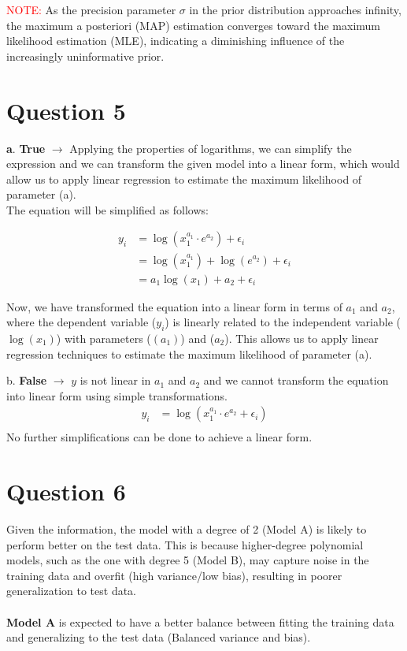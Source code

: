 \documentclass{article}
\begin{document}
\textcolor{red}{NOTE:} As the precision parameter $\sigma$ in the prior distribution approaches infinity, the maximum a posteriori (MAP) estimation converges toward the maximum likelihood estimation (MLE), indicating a diminishing influence of the increasingly uninformative prior.



\pagebreak

\section{Question 5}
\textbf{a}. \textbf{True} $\rightarrow$ Applying the properties of logarithms, we can simplify the expression and we can transform the given model into a linear form, which would allow us to apply linear regression to estimate the maximum likelihood of parameter (a).\\[2ex]
The equation will be simplified as follows:

\[
\begin{aligned}
y_i &= \log\left(x_1^{a_1} \cdot e^{a_2}\right) + \epsilon_i \\
&= \log(x_1^{a_1}) + \log(e^{a_2}) + \epsilon_i \\
&= a_1 \log(x_1) + a_2 + \epsilon_i
\end{aligned}
\]

\bigskip

\bigskip

Now, we have transformed the equation into a linear form in terms of $a_{1}$ and $a_{2}$, where the dependent variable ($y_i$) is linearly related to the independent variable ($\log(x_1)$) with parameters ($(a_1)$) and ($a_2$). This allows us to apply linear regression techniques to estimate the maximum likelihood of parameter (a).

\bigskip
\hrulefill
\bigskip

b. \textbf{False} $\rightarrow$ $y$ is not linear in $a_1$ and $a_2$ and we cannot transform the equation into linear form using simple transformations.
\[
\begin{aligned}
y_i &= \log(x_1^{a_1} \cdot e^{a_2} + \epsilon_i) \\
\end{aligned}
\]
 No further simplifications can be done to achieve a linear form.
\pagebreak

\section{Question 6}

Given the information, the model with a degree of 2 (Model A) is likely to perform better on the test data. This is because higher-degree polynomial models, such as the one with degree 5 (Model B), may capture noise in the training data and overfit (high variance/low bias), resulting in poorer generalization to test data. \\\\
\textbf{Model A} is expected to have a better balance between fitting the training data and generalizing to the test data (Balanced variance and bias).
\end{document}
